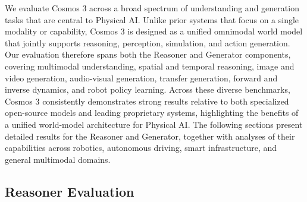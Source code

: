 \documentclass{llmxive}
\begin{document}
We evaluate Cosmos 3 across a broad spectrum of understanding and generation tasks that are central to Physical AI. Unlike prior systems that focus on a single modality or capability, Cosmos 3 is designed as a unified omnimodal world model that jointly supports reasoning, perception, simulation, and action generation. Our evaluation therefore spans both the Reasoner and Generator components, covering multimodal understanding, spatial and temporal reasoning, image and video generation, audio-visual generation, transfer generation, forward and inverse dynamics, and robot policy learning. Across these diverse benchmarks, Cosmos 3 consistently demonstrates strong results relative to both specialized open-source models and leading proprietary systems, highlighting the benefits of a unified world-model architecture for Physical AI. The following sections present detailed results for the Reasoner and Generator, together with analyses of their capabilities across robotics, autonomous driving, smart infrastructure, and general multimodal domains. 

\subsection{Reasoner Evaluation}
\end{document}
